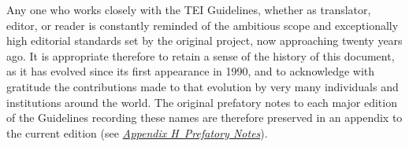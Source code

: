 Any one who works closely with the TEI Guidelines, whether as translator, editor, or reader is constantly reminded of the ambitious scope and exceptionally high editorial standards set by the original project, now approaching twenty years ago. It is appropriate therefore to retain a sense of the history of this document, as it has evolved since its first appearance in 1990, and to acknowledge with gratitude the contributions made to that evolution by very many individuals and institutions around the world. The original prefatory notes to each major edition of the Guidelines recording these names are therefore preserved in an appendix to the current edition (see \textit{\hyperref[PREFS]{Appendix H\ Prefatory Notes}}).